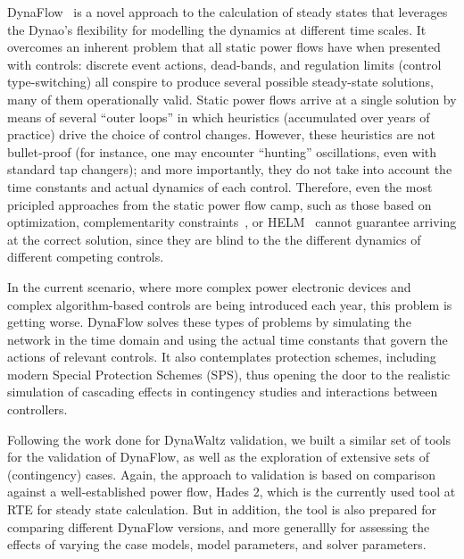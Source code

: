 \documentclass[conference]{IEEEtran}
\newcommand{\Dynawo}{Dyna\textomega o\xspace} %
\begin{document}
DynaFlow~\cite{Cossart21} is a novel approach to the calculation of steady states
that leverages the \Dynawo's flexibility for modelling the dynamics at different
time scales. It overcomes an inherent problem that all static power flows have
when presented with controls: discrete event actions, dead-bands, and regulation
limits (control type-switching) all conspire to produce several possible
steady-state solutions, many of them operationally valid.  Static power flows
arrive at a single solution by means of several ``outer loops'' in which
heuristics (accumulated over years of practice) drive the choice of control
changes. However, these heuristics are not bullet-proof (for instance, one may
encounter ``hunting'' oscillations, even with standard tap changers); and more
importantly, they do not take into account the time constants and actual
dynamics of each control. Therefore, even the most pricipled approaches from the
static power flow camp, such as those based on optimization\cite{Ju20},
complementarity constraints~\cite{Murray15}, or HELM~\cite{Trias18} cannot
guarantee arriving at the correct solution, since they are blind to the the
different dynamics of different competing controls.

In the current scenario, where more complex power electronic devices
and complex algorithm-based controls are being introduced each year,
this problem is getting worse. DynaFlow solves these types of problems
by simulating the network in the time domain and using the actual time
constants that govern the actions of relevant controls. It also
contemplates protection schemes, including modern Special Protection
Schemes (SPS), thus opening the door to the realistic simulation of
cascading effects in contingency studies and interactions between
controllers.

Following the work done for DynaWaltz validation, we built a similar
set of tools for the validation of DynaFlow, as well as the
exploration of extensive sets of (contingency) cases.  Again, the
approach to validation is based on comparison against a
well-established power flow, Hades 2, which is the currently used tool
at RTE for steady state calculation. But in addition, the tool is also
prepared for comparing different DynaFlow versions, and more
generallly for assessing the effects of varying the case models, model
parameters, and solver parameters.


\end{document}

